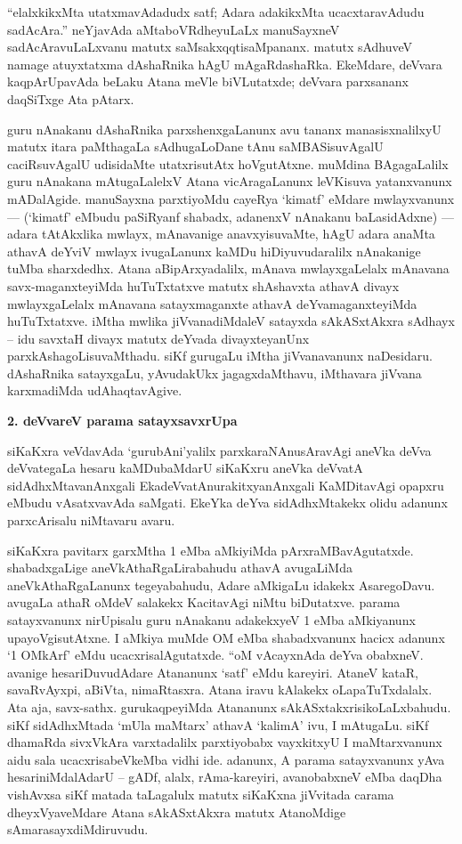 ``elalxkikxMta utatxmavAdadudx satf; Adara adakikxMta ucacxtaravAdudu sadAcAra.'' neYjavAda aMtaboVRdheyuLaLx manuSayxneV sadAcAravuLaLxvanu matutx saMsakxqqtisaMpananx. matutx sAdhuveV namage atuyxtatxma dAshaRnika hAgU mAgaRdashaRka. EkeMdare, deVvara kaqpArUpavAda beLaku Atana meVle biVLutatxde; deVvara parxsananx daqSiTxge Ata pAtarx.

guru nAnakanu dAshaRnika parxshenxgaLanunx avu tananx manasisxnalilxyU matutx itara paMthagaLa sAdhugaLoDane tAnu saMBASisuvAgalU caciRsuvAgalU udisidaMte utatxrisutAtx hoVgutAtxne. muMdina BAgagaLalilx guru nAnakana mAtugaLalelxV Atana vicAragaLanunx leVKisuva yatanxvanunx mADalAgide. manuSayxna parxtiyoMdu cayeRya `kimatf' eMdare mwlayxvanunx --- (`kimatf' eMbudu paSiRyanf shabadx, adanenxV nAnakanu baLasidAdxne) --- adara tAtAkxlika mwlayx, mAnavanige anavxyisuvaMte, hAgU adara anaMta athavA deYviV mwlayx ivugaLanunx kaMDu hiDiyuvudaralilx nAnakanige tuMba sharxdedhx. Atana aBipArxyadalilx, mAnava mwlayxgaLelalx mAnavana savx-maganxteyiMda huTuTxtatxve matutx shAshavxta athavA divayx mwlayxgaLelalx mAnavana satayxmaganxte athavA deYvamaganxteyiMda huTuTxtatxve. iMtha mwlika jiVvanadiMdaleV satayxda sAkASxtAkxra sAdhayx -- idu savxtaH divayx matutx deYvada divayxteyanUnx parxkAshagoLisuvaMthadu. siKf gurugaLu iMtha jiVvanavanunx naDesidaru. dAshaRnika satayxgaLu, yAvudakUkx jagagxdaMthavu, iMthavara jiVvana karxmadiMda udAhaqtavAgive.

\bigskip
\begin{center}
{\Large\bf 2. deVvareV parama satayxsavxrUpa}
\end{center}

siKaKxra veVdavAda `gurubAni'yalilx parxkaraNAnusAravAgi aneVka deVva deVvate\-gaLa hesaru kaMDubaMdarU siKaKxru aneVka deVvatA sidAdhxMtavanAnxgali EkadeVvatAnu\-rakitxyanAnxgali KaMDitavAgi opapxru eMbudu vAsatxvavAda saMgati. EkeYka deYva sidAdhxMtakekx olidu adanunx parxcArisalu niMtavaru avaru.

siKaKxra pavitarx garxMtha {\rm 1} eMba aMkiyiMda pArxraMBavAgutatxde. shabadxgaLige aneVkAthaRgaLirabahudu athavA avugaLiMda aneVkAthaRgaLanunx tegeyabahudu, Adare aMkigaLu idakekx AsaregoDavu. avugaLa athaR oMdeV salakekx KacitavAgi niMtu biDutatxve. parama satayxvanunx nirUpisalu guru nAnakanu adakekxyeV {\rm 1} eMba aMkiyanunx upayoVgisutAtxne. I aMkiya muMde OM eMba shabadxvanunx hacicx adanunx `{\rm 1} OMkArf' eMdu ucacxrisalAgutatxde. ``oM vAcayxnAda deYva obabxneV. avanige hesariDuvudAdare Atananunx `satf' eMdu kareyiri. AtaneV kataR, savaRvAyxpi, aBiVta, nimaRtasxra. Atana iravu kAlakekx oLapaTuTxdalalx. Ata aja, savx-sathx. gurukaqpeyiMda Atananunx sAkASxtakxrisikoLaLxbahudu. siKf sidAdhxMtada `mUla maMtarx' athavA `kalimA' ivu, I mAtugaLu. siKf dhamaRda sivxVkAra varxtadalilx parxtiyobabx vayxkitxyU I maMtarxvanunx aidu sala ucacxrisabeVkeMba vidhi ide. adanunx, A parama satayxvanunx yAva hesariniMdalAdarU -- gADf, alalx, rAma-kareyiri, avanobabxneV eMba daqDha vishAvxsa siKf matada taLagalulx matutx siKaKxna jiVvitada carama dheyxVyaveMdare Atana sAkASxtAkxra matutx AtanoMdige sAmarasayxdiMdiruvudu.

